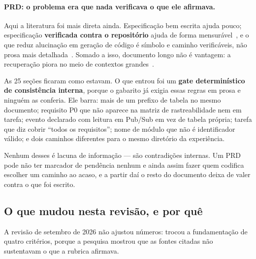 \documentclass[11pt,a4paper]{article}
\begin{document}
\paragraph{PRD: o problema era que nada verificava o que ele afirmava.} Aqui a literatura foi mais
direta ainda. Especificação bem escrita ajuda pouco; especificação \textbf{verificada contra o
repositório} ajuda de forma mensurável~\cite{speckit2026}, e o que reduz alucinação em geração de
código é símbolo e caminho verificáveis, não prosa mais detalhada~\cite{dehallucinator2024}. Somado
a isso, documento longo não é vantagem: a recuperação piora no meio de contextos
grandes~\cite{liu2024}.

As 25 seções ficaram como estavam. O que entrou foi um \textbf{gate determinístico de consistência
interna}, porque o gabarito já exigia essas regras em prosa e ninguém as conferia. Ele barra: mais
de um prefixo de tabela no mesmo documento; requisito P0 que não aparece na matriz de
rastreabilidade nem em tarefa; evento declarado com leitura em Pub/Sub em vez de tabela própria;
tarefa que diz cobrir ``todos os requisitos''; nome de módulo que não é identificador válido; e dois
caminhos diferentes para o mesmo diretório da experiência.

Nenhum desses é lacuna de informação --- são contradições internas. Um PRD pode não ter marcador de
pendência nenhum e ainda assim fazer quem codifica escolher um caminho ao acaso, e a partir daí o
resto do documento deixa de valer contra o que foi escrito.

\subsection{O que mudou nesta revisão, e por quê}

A revisão de setembro de 2026 não ajustou números: trocou a fundamentação de quatro critérios, porque
a pesquisa mostrou que as fontes citadas não sustentavam o que a rubrica afirmava.
\end{document}
